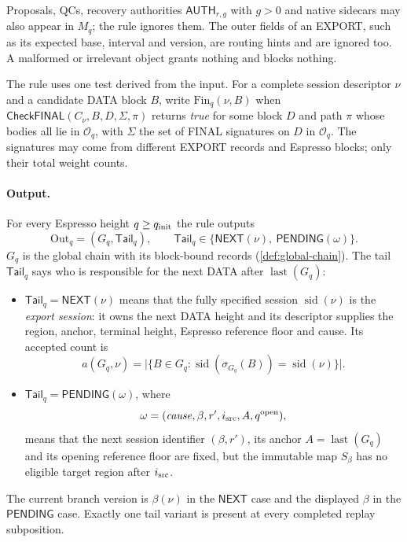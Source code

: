 \documentclass[11pt,a4paper]{article}
\newcommand{\tagg}[1]{\ensuremath{\mathsf{#1}}}
\newcommand{\defterm}[1]{\textcolor{rrBlue}{\textit{#1}}}
\begin{document}
Proposals, QCs, recovery authorities
$\tagg{AUTH}_{r,g}$ with $g>0$ and native sidecars may also appear in
$M_q$; the rule ignores them. The outer fields of an EXPORT, such as its
expected base, interval and version, are routing hints and are ignored
too. A malformed or irrelevant object grants nothing and blocks nothing.

The rule uses one test derived from the input. For a complete session
descriptor $\nu$ and a candidate DATA block $B$, write
$\mathrm{Fin}_q(\nu,B)$ when
$\tagg{CheckFINAL}(C_\nu,B,D,\Sigma,\pi)$ returns \emph{true} for
some block $D$ and path $\pi$ whose bodies all lie in $\mathcal O_q$, with
$\Sigma$ the set of FINAL signatures on $D$ in $\mathcal O_q$. The
signatures may come from different EXPORT records and Espresso blocks;
only their total weight counts.

\paragraph{Output.}
For every Espresso height $q\ge q_{\rm init}$ the rule outputs
\[
 \boxed{\mathrm{Out}_q=(G_q,\mathsf{Tail}_q)},\qquad
 \mathsf{Tail}_q\in\{\tagg{NEXT}(\nu),\ \tagg{PENDING}(\omega)\}.
\]
$G_q$ is the global chain with its block-bound records
(\cref{def:global-chain}).  The tail $\mathsf{Tail}_q$ says who is responsible for
the next DATA after $\operatorname{last}(G_q)$:
\begin{itemize}[itemsep=2pt]
\item $\mathsf{Tail}_q=\tagg{NEXT}(\nu)$ means that the fully specified session
$\operatorname{sid}(\nu)$ is the \defterm{export session}: it owns the
next DATA height and its descriptor supplies the region, anchor,
terminal height, Espresso reference floor and cause. Its accepted count is
\[
 a(G_q,\nu)=
 \bigl|\{B\in G_q:\operatorname{sid}(\sigma_{G_q}(B))
                 =\operatorname{sid}(\nu)\}\bigr|.
 \]
\item $\mathsf{Tail}_q=\tagg{PENDING}(\omega)$, where
\[
 \omega=(\mathit{cause},\beta,r',i_{\rm src},A,q^{\rm open}),
\]
means that the next session identifier $(\beta,r')$, its anchor
$A=\operatorname{last}(G_q)$ and its opening reference floor are fixed,
but the immutable map $S_\beta$ has no eligible target region after
$i_{\rm src}$.
\end{itemize}
The current branch version is $\beta(\nu)$ in the \tagg{NEXT} case and
the displayed $\beta$ in the \tagg{PENDING} case.  Exactly one tail
variant is present at every completed replay subposition.
\end{document}
